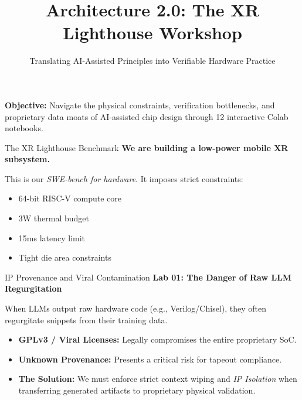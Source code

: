 \documentclass[aspectratio=169,10pt]{beamer}
\title{\textcolor{ArchBlue}{Architecture 2.0:} The XR Lighthouse Workshop}
\subtitle{Translating AI-Assisted Principles into Verifiable Hardware Practice}
\author{}
\date{}
\begin{document}
\begin{frame}[plain]
  \vspace{1.5cm}
  \inserttitle\par
  \vspace{0.25cm}
  \textcolor{ArchMuted}{\insertsubtitle}\par
  \vspace{1.5cm}

  \small\textcolor{ArchInk}{\textbf{Objective:}} Navigate the physical constraints, verification bottlenecks, and proprietary data moats of AI-assisted chip design through 12 interactive Colab notebooks.
\end{frame}

\begin{frame}{The XR Lighthouse Benchmark}
  \textbf{We are building a low-power mobile XR subsystem.}

  \vspace{0.3cm}
  This is our \textit{SWE-bench for hardware}. It imposes strict constraints:
  \begin{itemize}
    \item 64-bit RISC-V compute core
    \item 3W thermal budget
    \item 15ms latency limit
    \item Tight die area constraints
  \end{itemize}

  \vspace{0.3cm}
  \begin{center}
  \end{center}
\end{frame}

\begin{frame}{IP Provenance and Viral Contamination}
  \textbf{Lab 01: The Danger of Raw LLM Regurgitation}

  \vspace{0.3cm}
  When LLMs output raw hardware code (e.g., Verilog/Chisel), they often regurgitate snippets from their training data.

  \vspace{0.4cm}
  \begin{itemize}
    \item \textbf{GPLv3 / Viral Licenses:} Legally compromises the entire proprietary SoC.
    \item \textbf{Unknown Provenance:} Presents a critical risk for tapeout compliance.
    \item \textbf{The Solution:} We must enforce strict context wiping and \textit{IP Isolation} when transferring generated artifacts to proprietary physical validation.
  \end{itemize}
\end{frame}
\end{document}

